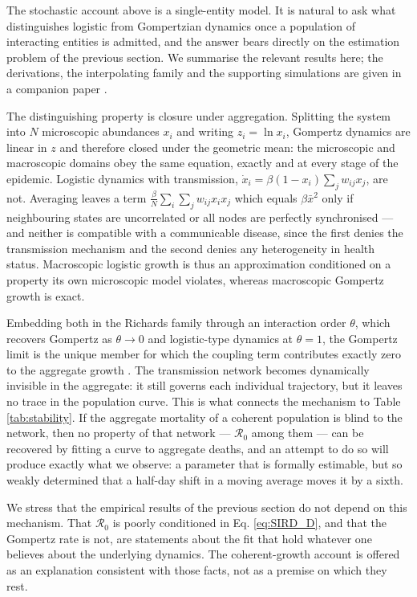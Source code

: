 \documentclass{article}
\begin{document}
The stochastic account above is a single-entity model. It is natural to ask what
distinguishes logistic from Gompertzian dynamics once a population of interacting
entities is admitted, and the answer bears directly on the estimation problem of the
previous section. We summarise the relevant results here; the derivations, the
interpolating family and the supporting simulations are given in a companion
paper \cite{haugen2026micro}.

The distinguishing property is closure under aggregation. Splitting the system into $N$
microscopic abundances $x_i$ and writing $z_i=\ln x_i$, Gompertz dynamics are linear in
$z$ and therefore closed under the geometric mean: the microscopic and macroscopic
domains obey the same equation, exactly and at every stage of the epidemic. Logistic
dynamics with transmission, $\dot{x}_i = \beta(1-x_i)\sum_j w_{ij}x_j$, are not.
Averaging leaves a term $\frac{\beta}{N}\sum_{i}\sum_j w_{ij}x_ix_j$ which equals
$\beta\bar{x}^2$ only if neighbouring states are uncorrelated or all nodes are perfectly
synchronised --- and neither is compatible with a communicable disease, since the first
denies the transmission mechanism and the second denies any heterogeneity in health
status. Macroscopic logistic growth is thus an approximation conditioned on a property
its own microscopic model violates, whereas macroscopic Gompertz growth is exact.

Embedding both in the Richards family through an interaction order $\theta$, which
recovers Gompertz as $\theta\to0$ and logistic-type dynamics at $\theta=1$, the Gompertz
limit is the unique member for which the coupling term contributes exactly zero to the
aggregate growth \cite{haugen2026micro}. The transmission network becomes dynamically
invisible in the aggregate: it still governs each individual trajectory, but it leaves no
trace in the population curve. This is what connects the mechanism to
Table \ref{tab:stability}. If the aggregate mortality of a coherent population is blind
to the network, then no property of that network --- $\mathcal{R}_0$ among them --- can be
recovered by fitting a curve to aggregate deaths, and an attempt to do so will produce
exactly what we observe: a parameter that is formally estimable, but so weakly determined
that a half-day shift in a moving average moves it by a sixth.

We stress that the empirical results of the previous section do not depend on this
mechanism. That $\mathcal{R}_0$ is poorly conditioned in Eq. \ref{eq:SIRD_D}, and that
the Gompertz rate is not, are statements about the fit that hold whatever one believes
about the underlying dynamics. The coherent-growth account is offered as an explanation
consistent with those facts, not as a premise on which they rest.
\end{document}
